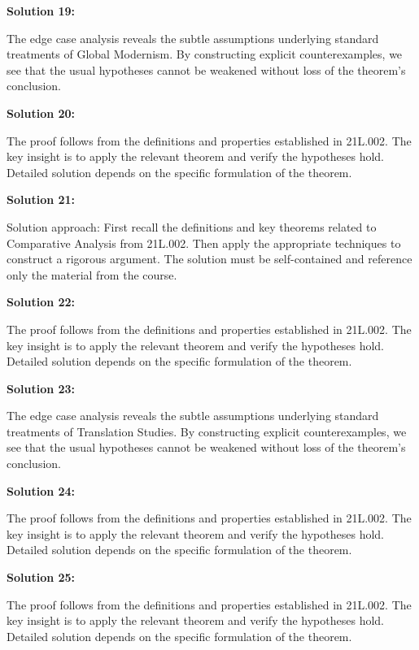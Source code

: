 \documentclass[12pt,a4paper]{exam}
\begin{document}
\vspace{0.5cm}

\textbf{Solution 19:}

The edge case analysis reveals the subtle assumptions underlying standard treatments of Global Modernism. By constructing explicit counterexamples, we see that the usual hypotheses cannot be weakened without loss of the theorem's conclusion.

\vspace{0.5cm}

\textbf{Solution 20:}

The proof follows from the definitions and properties established in 21L.002. The key insight is to apply the relevant theorem and verify the hypotheses hold. Detailed solution depends on the specific formulation of the theorem.

\vspace{0.5cm}

\textbf{Solution 21:}

Solution approach: First recall the definitions and key theorems related to Comparative Analysis from 21L.002. Then apply the appropriate techniques to construct a rigorous argument. The solution must be self-contained and reference only the material from the course.

\vspace{0.5cm}

\textbf{Solution 22:}

The proof follows from the definitions and properties established in 21L.002. The key insight is to apply the relevant theorem and verify the hypotheses hold. Detailed solution depends on the specific formulation of the theorem.

\vspace{0.5cm}

\textbf{Solution 23:}

The edge case analysis reveals the subtle assumptions underlying standard treatments of Translation Studies. By constructing explicit counterexamples, we see that the usual hypotheses cannot be weakened without loss of the theorem's conclusion.

\vspace{0.5cm}

\textbf{Solution 24:}

The proof follows from the definitions and properties established in 21L.002. The key insight is to apply the relevant theorem and verify the hypotheses hold. Detailed solution depends on the specific formulation of the theorem.

\vspace{0.5cm}

\textbf{Solution 25:}

The proof follows from the definitions and properties established in 21L.002. The key insight is to apply the relevant theorem and verify the hypotheses hold. Detailed solution depends on the specific formulation of the theorem.

\vspace{0.5cm}
\end{document}
